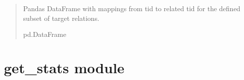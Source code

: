 \documentclass[letterpaper,10pt,english]{sphinxmanual}
\begin{document}
\begin{fulllineitems}
\begin{quote}
\begin{description}
\sphinxAtStartPar
Pandas DataFrame with mappings from tid to related tid for the defined subset of target relations.

\sphinxAtStartPar
pd.DataFrame

\end{description}\end{quote}

\end{fulllineitems}


\sphinxstepscope


\section{get\_stats module}
\label{\detokenize{get_stats:module-get_stats}}\label{\detokenize{get_stats:get-stats-module}}\label{\detokenize{get_stats::doc}}
\end{document}
